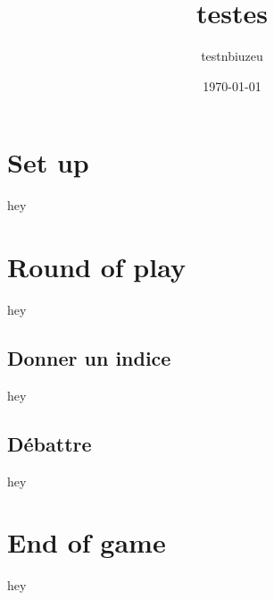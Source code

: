 \documentclass{article}%
\title{testes}%
\author{testnbiuzeu}%
\date{\today}%
\begin{document}
%
\pagestyle{empty}%
\normalsize%
\maketitle%
\section{ Set up
}%
\label{sec:Setup}%
hey

%
\section{ Round of play
}%
\label{sec:Roundofplay}%
hey

%
\subsection{ Donner un indice
}%
\label{subsec:Donnerunindice}%
hey

%
\subsection{ Débattre
}%
\label{subsec:Dbattre}%
hey

%
\section{ End of game
}%
\label{sec:Endofgame}%
hey

%
\end{document}
